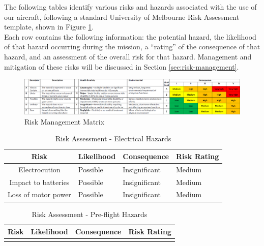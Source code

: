 \label{sec:risk-assessment}
The following tables identify various risks and hazards associated with the use of our aircraft, following a standard University of Melbourne Risk Assessment template, shown in Figure \ref{fig:risk-matrix}.\\

Each row contains the following information: the potential hazard, the likelihood of that hazard occurring during the mission, a ``rating'' of the consequence of that hazard, and an assessment of the overall risk for that hazard. Management and mitigation of these risks will be discussed in Section \ref{sec:risk-management}.

\begin{figure}[H]
	\centering
	\centerline{\includegraphics[width=580pt]{../Images/risk-matrix}}
	\caption{Risk Management Matrix}
	\label{fig:risk-matrix}
\end{figure}

\begin{table}[!h]
	\label{tab:risks-electrical}
	\centering
	\begin{tabularx}{\textwidth}{|c|Y|Y|Y|}
		\hline
		\textbf{Risk} & \textbf{Likelihood} & \textbf{Consequence} & \textbf{Risk Rating}\\
		\hline
		Electrocution & Possible & Insignificant & Medium\\
		\hline
		Impact to batteries & Possible & Insignificant & Medium\\
		\hline
		Loss of motor power & Possible & Insignificant & Medium\\
		\hline
	\end{tabularx} 
	\caption{Risk Assessment - Electrical Hazards}
\end{table}

\begin{table}[!h]
	\label{tab:risks-preflight}
	\centering
	\begin{tabularx}{\textwidth}{|c|Y|Y|Y|}
		\hline
		\textbf{Risk} & \textbf{Likelihood} & \textbf{Consequence} & \textbf{Risk Rating}\\
		\hline
		 & & & \\
		\hline
	\end{tabularx} 
	\caption{Risk Assessment - Pre-flight Hazards}
\end{table}

